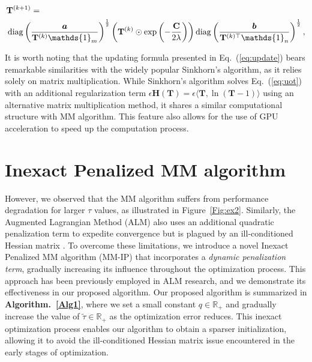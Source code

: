 \documentclass[a4paper,twocolumn]{article}
\newcommand{\R}{\mathbb{R}}
\newcommand{\one}{\mathds{1}}
\newcommand{\mat}[1]{\mathbf{#1}}
\renewcommand{\vec}[1]{\bm{#1}}
\begin{document}
\begin{align}
\label{eq:update}
&\mat{T}^{(k+1)}=\notag\\
&\operatorname{diag}\left(\frac{\vec a}{\mat{T}^{(k)} \one_m}\right)^{\frac{1}{2}}\left(\mat{T}^{(k)} \odot \exp \left(-\frac{\mat C}{2 \lambda}\right)\right)
\operatorname{diag}\left(\frac{\vec{b}}{\mat{T}^{(k) \top} \one_n}\right)^{\frac{1}{2}},\notag\\
\end{align}

It is worth noting that the updating formula presented in Eq.~(\ref{eq:update}) bears remarkable similarities with the widely popular Sinkhorn's algorithm, as it relies solely on matrix multiplication. While Sinkhorn's algorithm solves Eq.~(\ref{eq:uot}) with an additional regularization term $\epsilon \mat H(\mat T) = \epsilon \langle \mat T,\ln(\mat T - 1)\rangle$ using an alternative matrix multiplication method, it shares a similar computational structure with MM algorithm. This feature also allows for the use of GPU acceleration to speed up the computation process.


\section{Inexact Penalized MM algorithm}
However, we observed that the MM algorithm suffers from performance degradation for larger $\tau$ values, as illustrated in Figure~\ref{Fig:ex2}. Similarly, the Augmented Lagrangian Method (ALM) also uses an additional quadratic penalization term to expedite convergence but is plagued by an ill-conditioned Hessian matrix \cite{doi:10.1137/1.9781611973365}.
To overcome these limitations, we introduce a novel Inexact Penalized MM algorithm (MM-IP) that incorporates a {\it dynamic penalization term}, gradually increasing its influence throughout the optimization process. This approach has been previously employed in ALM research, and we demonstrate its effectiveness in our proposed algorithm. Our proposed algorithm is summarized in {\bf Algorithm.~\ref{Alg1}}, where we set a small constant $q \in \R_+ $ and gradually increase the value of $\tilde{\tau}\in \R_+$ as the optimization error reduces. This inexact optimization process enables our algorithm to obtain a sparser initialization, allowing it to avoid the ill-conditioned Hessian matrix issue encountered in the early stages of optimization.
\end{document}
